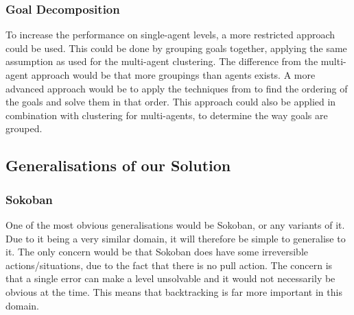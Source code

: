 \documentclass[letterpaper]{article}
\begin{document}

		\subsubsection{Goal Decomposition}
			To increase the performance on single-agent levels, a more restricted approach could be used. This could be done by grouping goals together, applying the same assumption as used for the multi-agent clustering. The difference from the multi-agent approach would be that more groupings than agents exists. A more advanced approach would be to apply the techniques from \cite{Subgoals} to find the ordering of the goals and solve them in that order. This approach could also be applied in combination with clustering for multi-agents, to determine the way goals are grouped.

			
			

	\subsection{Generalisations of our Solution}


		
		\subsubsection{Sokoban}
			One of the most obvious generalisations would be Sokoban, or any variants of it. Due to it being a very similar domain, it will therefore be simple to generalise to it. The only concern would be that Sokoban does have some irreversible actions/situations, due to the fact that there is no pull action. The concern is that a single error can make a level unsolvable and it would not necessarily be obvious at the time. This means that backtracking is far more important in this domain.
\end{document}
